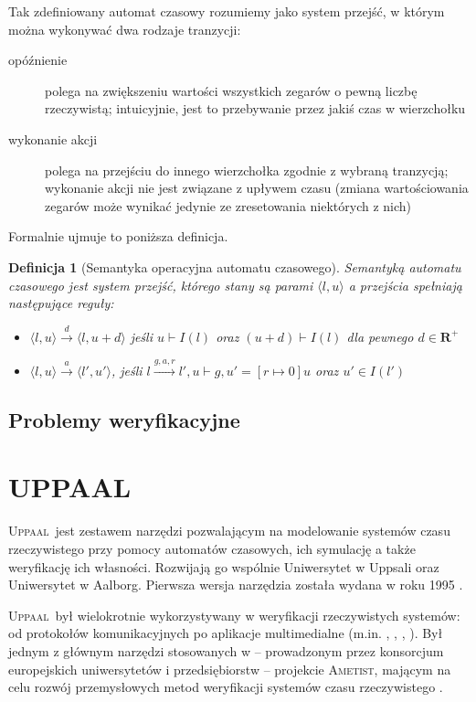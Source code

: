 \documentclass{pracamgr}
\newcommand{\upp}{\textsc{Uppaal}}
\newcommand{\pair}[2]{\langle #1, #2 \rangle}
\theoremstyle{plain}
\newtheorem{definition}{Definicja}
\begin{document}
Tak zdefiniowany automat czasowy rozumiemy jako
system przejść, w którym można wykonywać dwa rodzaje tranzycji:
\begin{description}
  \item[opóźnienie] polega na zwiększeniu wartości wszystkich zegarów
  o pewną liczbę rzeczywistą; intuicyjnie, jest to przebywanie przez
  jakiś czas w wierzchołku
  \item[wykonanie akcji] polega na przejściu do innego wierzchołka
  zgodnie z wybraną tranzycją; wykonanie akcji nie jest związane z
  upływem czasu (zmiana wartościowania zegarów może wynikać jedynie ze
  zresetowania niektórych z nich)
\end{description}
Formalnie ujmuje to poniższa definicja.
\begin{definition}[Semantyka operacyjna automatu czasowego] Semantyką
  automatu czasowego jest system przejść, którego stany są parami
$\langle l, u \rangle$ a przejścia spełniają następujące reguły:
  \begin{itemize}
    \item $\pair{l}{u} \stackrel{d}{\longrightarrow} \pair{l}{u+d}$
    jeśli $u \vdash I(l)$ oraz $(u+d) \vdash I(l)$ dla pewnego $d \in
    \mathbf{R}^{+}$
    \item $\pair{l}{u} \stackrel{a}{\longrightarrow} \pair{l'}{u'}$,
    jeśli $l \stackrel{g, a, r}{\longrightarrow} l', u \vdash g, u' =
    [r \mapsto 0]u$ oraz $u' \in I(l')$
  \end{itemize}
\end{definition}

\subsection{Problemy weryfikacyjne}

\section{UPPAAL}

\upp\ jest zestawem narzędzi pozwalającym na modelowanie systemów czasu
rzeczywistego przy pomocy automatów czasowych, ich symulację a także
weryfikację ich własności. Rozwijają go wspólnie Uniwersytet w Uppsali
oraz Uniwersytet w Aalborg. Pierwsza wersja narzędzia została wydana w roku
1995 \cite{lpw:fct95}.

\upp\ był wielokrotnie wykorzystywany w weryfikacji rzeczywistych
systemów: od protokołów komunikacyjnych po aplikacje multimedialne
(m.in. \cite{lp:prfts97}, \cite{lpw:tacas98},
\cite{DBLP:conf/icfem/BordbarO03},
\cite{Ravn:2011:MVW:1987389.1987431}). Był jednym z głównym narzędzi
stosowanych w -- prowadzonym przez konsorcjum europejskich
uniwersytetów i przedsiębiorstw -- projekcie \textsc{Ametist}, mającym
na celu rozwój przemysłowych metod weryfikacji systemów czasu
rzeczywistego \cite{AMETISTfinal}.
\end{document}

